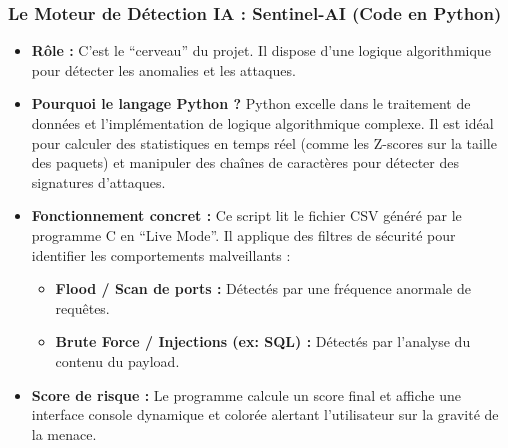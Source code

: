 \documentclass[a4paper, 12pt, twoside]{article}
\begin{document}
\subsubsection*{Le Moteur de Détection IA : Sentinel-AI (Code en Python)}
\begin{itemize}
    \item \textbf{Rôle :} C'est le ``cerveau'' du projet. Il dispose d'une logique algorithmique pour détecter les anomalies et les attaques.
    \item \textbf{Pourquoi le langage Python ?} Python excelle dans le traitement de données et l'implémentation de logique algorithmique complexe. Il est idéal pour calculer des statistiques en temps réel (comme les Z-scores sur la taille des paquets) et manipuler des chaînes de caractères pour détecter des signatures d'attaques.
    \item \textbf{Fonctionnement concret :} Ce script lit le fichier CSV généré par le programme C en ``Live Mode''. Il applique des filtres de sécurité pour identifier les comportements malveillants :
    \begin{itemize}
        \item \textbf{Flood / Scan de ports :} Détectés par une fréquence anormale de requêtes.
        \item \textbf{Brute Force / Injections (ex: SQL) :} Détectés par l'analyse du contenu du payload.
    \end{itemize}
    \item \textbf{Score de risque :} Le programme calcule un score final et affiche une interface console dynamique et colorée alertant l'utilisateur sur la gravité de la menace.
\end{itemize}
\end{document}
